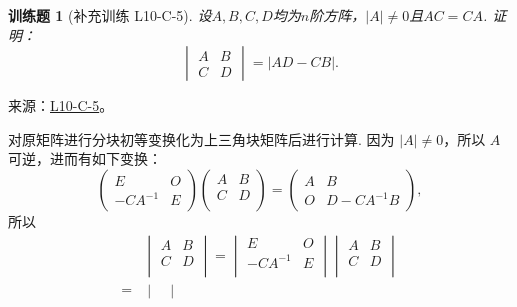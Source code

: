 \documentclass[12pt,fontset=fandol]{ctexart}
\newtheorem{exercise}{训练题}[section]
\begin{document}
\begin{exercise}[补充训练 L10-C-5]\label{prob:L10-C-5}
设$A,B,C,D$均为$n$阶方阵，$\lvert A \rvert \neq 0$且$AC=CA$. 证明：
        \[\begin{vmatrix}
                A & B \\ C & D
            \end{vmatrix} = |AD-CB|.\]
\end{exercise}
\noindent 来源：\href{https://github.com/yhwu-is/Linear-Algebra-Left-Undone/blob/new/%E8%AE%B2%E4%B9%89/%E4%B8%93%E9%A2%98/10%20%E8%A1%8C%E5%88%97%E5%BC%8F.tex}{L10-C-5}。
\begin{solve}
对原矩阵进行分块初等变换化为上三角块矩阵后进行计算. 因为 $\lvert A \rvert \neq 0$，所以 $A$ 可逆，进而有如下变换：
            \[\begin{pmatrix}
                    E        & O \\
                    -CA^{-1} & E
                \end{pmatrix} \begin{pmatrix}
                    A & B \\
                    C & D \\
                \end{pmatrix} = \begin{pmatrix}
                    A & B          \\
                    O & D-CA^{-1}B
                \end{pmatrix},\]
            所以
            \begin{align*}
                    & \begin{vmatrix}
                            A & B \\
                            C & D \\
                        \end{vmatrix}
                = \begin{vmatrix}
                        E        & O \\
                        -CA^{-1} & E \\
                    \end{vmatrix}
                \begin{vmatrix}
                    A & B \\
                    C & D \\
                \end{vmatrix}       \\
                ={} & \begin{vmatrix}

\end{vmatrix}
\end{align*}
\end{solve}
\end{document}
